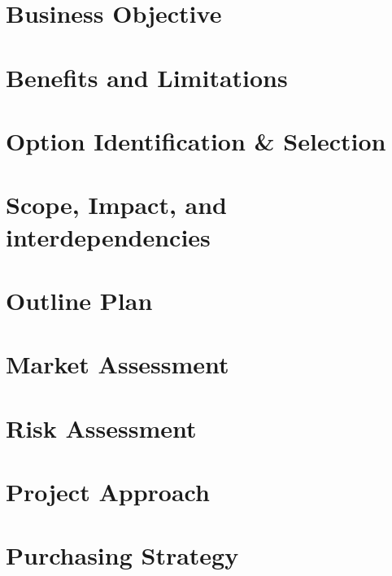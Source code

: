 \documentclass[letterpaper,10pt,openany,oneside,english]{sphinxmanual}
\begin{document}
\section{Business Objective}
\label{\detokenize{projectdefinition:business-objective}}

\section{Benefits and Limitations}
\label{\detokenize{projectdefinition:benefits-and-limitations}}

\section{Option Identification \& Selection}
\label{\detokenize{projectdefinition:option-identification-selection}}

\section{Scope, Impact, and interdependencies}
\label{\detokenize{projectdefinition:scope-impact-and-interdependencies}}

\section{Outline Plan}
\label{\detokenize{projectdefinition:outline-plan}}

\section{Market Assessment}
\label{\detokenize{projectdefinition:market-assessment}}

\section{Risk Assessment}
\label{\detokenize{projectdefinition:risk-assessment}}

\section{Project Approach}
\label{\detokenize{projectdefinition:project-approach}}

\section{Purchasing Strategy}
\label{\detokenize{projectdefinition:purchasing-strategy}}
\end{document}
